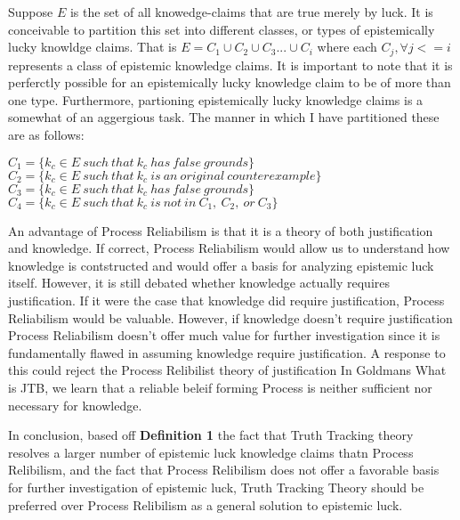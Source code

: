 \documentclass{article}
\begin{document}

Suppose $E$ is the set of all knowedge-claims that are true merely by luck.
It is conceivable to partition this set into different classes, or types
of epistemically lucky knowldge claims. That is $E = C_{1} \cup C_{2} \cup
C_{3} ... \cup C_{i}$ where each $C_{j}, \forall j <= i$ represents a class
of epistemic knowledge claims. It is important to note that it is perferctly
possible for an epistemically lucky knowledge claim to be of more than one type.
Furthermore, partioning epistemically lucky knowledge claims is a somewhat of an
aggergious task. The manner in which I have partitioned these are as follows:
\begin{displayquote}
$ C_{1} = \{ k_{c} \in E \ such \ that \ k_{c} \ has \ false \ grounds \} $ \\
$ C_{2} = \{ k_{c} \in E \ such \ that \ k_{c} \ is \ an \ original \ counterexample \} $ \\
$ C_{3} = \{ k_{c} \in E \ such \ that \ k_{c} \ has \ false \ grounds \} $ \\
$ C_{4} = \{ k_{c} \in E \ such \ that \ k_{c} \ is \ not \ in \ C_{1}, \ C_{2},
\ or \ C_{3}  \} $ \\
\end{displayquote}


An advantage of Process Reliabilism is that it is a theory of both
justification and knowledge. If correct, Process Reliabilism would
allow us to understand how knowledge is contstructed and would
offer a basis for analyzing epistemic luck itself. %
However, it is still debated whether knowledge actually requires justification.
If it were the case that knowledge did require justification, Process Reliabilism
would be valuable. However, if knowledge doesn't require justification
Process Reliabilism doesn't offer much value for further investigation
since it is fundamentally flawed in assuming knowledge require justification.
A response to this could reject the Process Relibilist theory of justification
In Goldmans What is JTB, we learn that a reliable beleif forming Process
is neither sufficient nor necessary for knowledge.


In conclusion, based off \textbf{Definition 1} the fact that Truth Tracking theory resolves
a larger number of epistemic luck knowledge claims thatn Process Relibilism, and the fact
that Process Relibilism does not offer a favorable basis for further investigation of
epistemic luck, Truth Tracking Theory should be preferred over Process Relibilism
as a general solution to epistemic luck.
\end{document}
